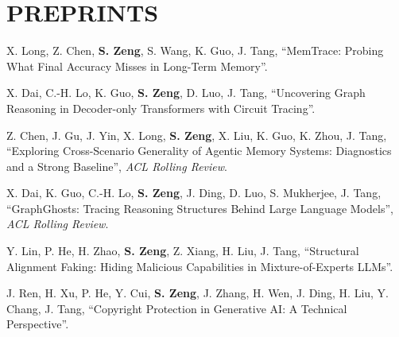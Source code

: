 \documentclass[11pt,a4paper,roman]{moderncv}        %
\newenvironment{publist}{%
  \begin{list}{}{%
    \setlength{\leftmargin}{34mm}%
    \setlength{\labelwidth}{32mm}%
    \setlength{\labelsep}{2mm}%
    \setlength{\itemsep}{1.4mm}%
    \setlength{\parsep}{0pt}%
    \setlength{\topsep}{1.5mm}%
    \renewcommand{\makelabel}[1]{\bfseries ##1\hfill}%
  }}{\end{list}}
\begin{document}
\section{PREPRINTS}
\begin{publist}
\item[{[Preprint]}] X. Long, Z. Chen, \textbf{S. Zeng}, S. Wang, K. Guo, J. Tang, ``MemTrace: Probing What Final Accuracy Misses in Long-Term Memory''.
\item[{[Preprint]}] X. Dai, C.-H. Lo, K. Guo, \textbf{S. Zeng}, D. Luo, J. Tang, ``Uncovering Graph Reasoning in Decoder-only Transformers with Circuit Tracing''.
\item[{[Under review]}] Z. Chen, J. Gu, J. Yin, X. Long, \textbf{S. Zeng}, X. Liu, K. Guo, K. Zhou, J. Tang, ``Exploring Cross-Scenario Generality of Agentic Memory Systems: Diagnostics and a Strong Baseline'', \textit{ACL Rolling Review}.
\item[{[Under review]}] X. Dai, K. Guo, C.-H. Lo, \textbf{S. Zeng}, J. Ding, D. Luo, S. Mukherjee, J. Tang, ``GraphGhosts: Tracing Reasoning Structures Behind Large Language Models'', \textit{ACL Rolling Review}.
\item[{[Preprint]}] Y. Lin, P. He, H. Zhao, \textbf{S. Zeng}, Z. Xiang, H. Liu, J. Tang, ``Structural Alignment Faking: Hiding Malicious Capabilities in Mixture-of-Experts LLMs''.
\item[{[Preprint]}] J. Ren, H. Xu, P. He, Y. Cui, \textbf{S. Zeng}, J. Zhang, H. Wen, J. Ding, H. Liu, Y. Chang, J. Tang, ``Copyright Protection in Generative AI: A Technical Perspective''.
\end{publist}
\end{document}

